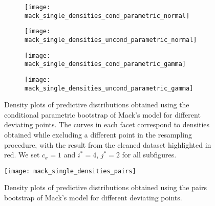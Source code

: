 \documentclass[a4paper]{book}
\begin{document}
\begin{landscape}
  \begin{figure}
    \begin{subfigure}{0.5\linewidth}
      \centering
      \texttt{[image: mack\_single\_densities\_cond\_parametric\_normal]}
    \end{subfigure}
    \begin{subfigure}{0.5\linewidth}
      \centering
      \texttt{[image: mack\_single\_densities\_uncond\_parametric\_normal]}
    \end{subfigure}
    \begin{subfigure}{0.5\linewidth}
      \centering
      \texttt{[image: mack\_single\_densities\_cond\_parametric\_gamma]}
    \end{subfigure}
    \begin{subfigure}{0.5\linewidth}
      \centering
      \texttt{[image: mack\_single\_densities\_uncond\_parametric\_gamma]}
    \end{subfigure}
    \caption{Density plots of predictive distributions obtained using the conditional parametric bootstrap of Mack's model for different deviating points. The curves in each facet correspond to densities obtained while excluding a different point in the resampling procedure, with the result from the cleaned dataset highlighted in red. We set $c_\sigma = 1$ and $i^* = 4$, $j^* = 2$ for all subfigures.}
    \label{fig:mack-single-param}
  \end{figure}
\end{landscape}

\begin{landscape}
  \setlength\tabcolsep{4pt}
  \renewcommand{\arraystretch}{1.2}
  
\end{landscape}

\begin{landscape}
  \begin{figure}
    \centering
    \texttt{[image: mack\_single\_densities\_pairs]}
    \caption{Density plots of predictive distributions obtained using the pairs bootstrap of Mack's model for different deviating points.}
    \label{fig:mack-single-pairs}
  \end{figure}
\end{landscape}
\end{document}
